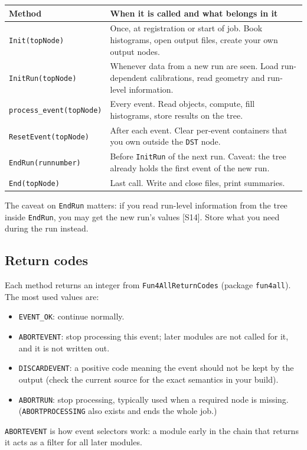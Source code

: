 \documentclass[11pt,letterpaper]{article}
\begin{document}
\par\noindent\begin{tabularx}{\linewidth}{@{}lX@{}}\toprule
Method & When it is called and what belongs in it \\\midrule
\texttt{Init(topNode)} & Once, at registration or start of job. Book histograms, open output files, create your own output nodes. \\
\texttt{InitRun(topNode)} & Whenever data from a new run are seen. Load run-dependent calibrations, read geometry and run-level information. \\
\texttt{process\_event(topNode)} & Every event. Read objects, compute, fill histograms, store results on the tree. \\
\texttt{ResetEvent(topNode)} & After each event. Clear per-event containers that you own outside the \texttt{DST} node. \\
\texttt{EndRun(runnumber)} & Before \texttt{InitRun} of the next run. Caveat: the tree already holds the first event of the new run. \\
\texttt{End(topNode)} & Last call. Write and close files, print summaries. \\\bottomrule
\end{tabularx}
\smallskip

The caveat on \texttt{EndRun} matters: if you read run-level information from the tree inside \texttt{EndRun}, you may get the new run's values [S14].
Store what you need during the run instead.

\subsection{Return codes}
Each method returns an integer from \texttt{Fun4AllReturnCodes} (package \texttt{fun4all}). The most used values are:
\begin{itemize}
\item \texttt{EVENT\_OK}: continue normally.
\item \texttt{ABORTEVENT}: stop processing this event; later modules are not called for it, and it is not written out.
\item \texttt{DISCARDEVENT}: a positive code meaning the event should not be kept by the output (check the current source for the exact semantics in your build).
\item \texttt{ABORTRUN}: stop processing, typically used when a required node is missing. (\texttt{ABORTPROCESSING} also exists and ends the whole job.)
\end{itemize}
\texttt{ABORTEVENT} is how event selectors work: a module early in the chain that returns it acts as a filter for all later modules.
\end{document}

